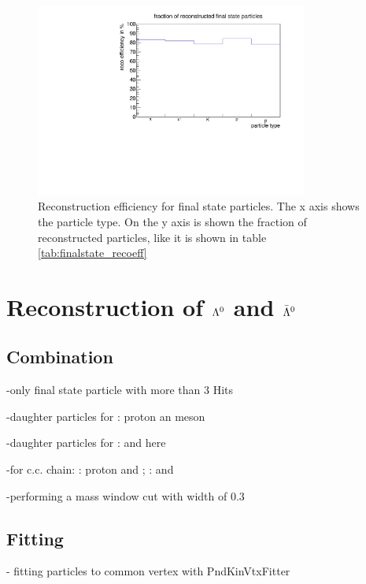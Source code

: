 	\begin{figure}
	
		\centering
		\includegraphics[width=0.8\textwidth]{./plots/finalstate/reco_efficiency.pdf}
		\caption{Reconstruction efficiency for final state particles. The x axis shows the particle type. 
				On the y axis is shown the fraction of reconstructed particles, like it is shown in table \ref{tab:finalstate_recoeff}}
		\label{fig:finalstate_recoeff}
	
	\end{figure}
	

	
\section{Reconstruction of $\boldmath{\Lambda}^0$ and $\boldmath{\bar{\Lambda}^0}$}
	\subsection*{Combination}
		-only final state particle with more than 3 Hits
		
		-daughter particles for \lam: proton an \piminus meson
		
		-daughter particles for \alam: \antiproton and \piplus here \piplustwo 
		
		-for c.c. chain: \lam: proton and \piminustwo; \alam: \antiproton and \piplus 
		
		-performing a mass window cut with width of $0.3$\massunit 
		
		
	\subsection*{Fitting}
	
		- fitting particles to common vertex with PndKinVtxFitter
	
